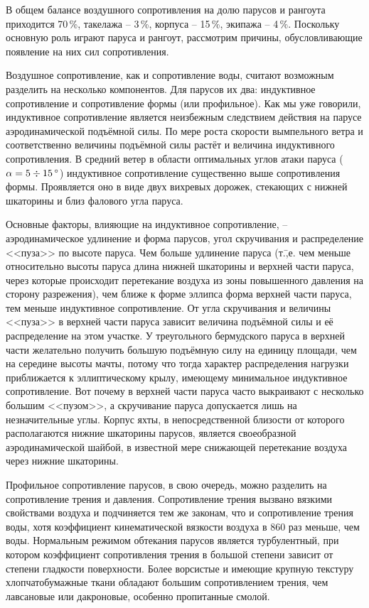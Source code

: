 В общем балансе воздушного сопротивления на долю парусов и рангоута
приходится 70\,\%, такелажа \--- 3\,\%, корпуса \---
15\,\%, экипажа \--- 4\,\%. Поскольку основную роль
играют паруса и рангоут, рассмотрим причины, обусловливающие появление
на них сил сопротивления.

Воздушное сопротивление, как и сопротивление воды, считают возможным
разделить на несколько компонентов. Для парусов их два: индуктивное
сопротивление и сопротивление формы (или профильное). Как мы уже
говорили, индуктивное сопротивление является неизбежным следствием
действия на парусе аэродинамической подъёмной силы. По мере роста
скорости вымпельного ветра и соответственно величины подъёмной силы
растёт и величина индуктивного сопротивления. В средний ветер в
области оптимальных углов атаки паруса ($\alpha = 5\div 15\,^\circ$)
индуктивное сопротивление существенно выше сопротивления
формы. Проявляется оно в виде двух вихревых дорожек, стекающих с
нижней шкаторины и близ фалового угла паруса.
 
Основные факторы, влияющие на индуктивное сопротивление, \---
аэродинамическое удлинение и форма парусов, угол скручивания и
распределение <<пуза>> по высоте паруса. Чем больше удлинение паруса
(т.\=,е. чем меньше относительно высоты паруса длина нижней шкаторины
и верхней части паруса, через которые происходит перетекание воздуха
из зоны повышенного давления на сторону разрежения), чем ближе к форме
эллипса форма верхней части паруса, тем меньше индуктивное
сопротивление. От угла скручивания и величины <<пуза>> в верхней части
паруса зависит величина подъёмной силы и её распределение на этом
участке. У треугольного бермудского паруса в верхней части желательно
получить большую подъёмную силу на единицу площади, чем на середине
высоты мачты, потому что тогда характер распределения нагрузки
приближается к эллиптическому крылу, имеющему минимальное индуктивное
сопротивление. Вот почему в верхней части паруса часто выкраивают с
несколько большим <<пузом>>, а скручивание паруса допускается лишь на
незначительные углы. Корпус яхты, в непосредственной близости от
которого располагаются нижние шкаторины парусов, является своеобразной
аэродинамической шайбой, в известной мере снижающей перетекание
воздуха через нижние шкаторины.

Профильное сопротивление парусов, в свою очередь, можно разделить на
сопротивление трения и давления. Сопротивление трения вызвано вязкими
свойствами воздуха и подчиняется тем же законам, что и сопротивление
трения воды, хотя коэффициент кинематической вязкости воздуха в 860
раз меньше, чем воды. Нормальным режимом обтекания парусов является
турбулентный, при котором коэффициент сопротивления трения в большой
степени зависит от степени гладкости поверхности. Более ворсистые и
имеющие крупную текстуру хлопчатобумажные ткани обладают большим
сопротивлением трения, чем лавсановые или дакроновые, особенно
пропитанные смолой.

